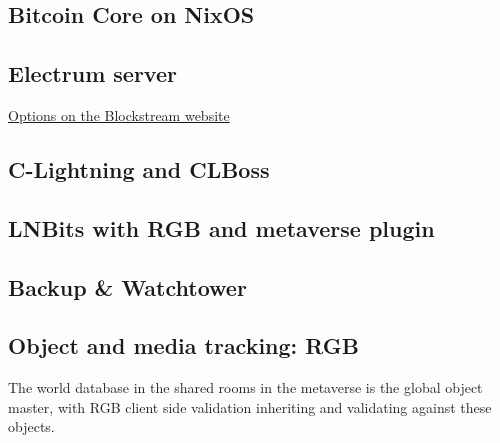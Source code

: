 \subsection{Bitcoin Core on NixOS}
\subsection{Electrum server}
\href{https://blog.blockstream.com/en-esplora-and-other-alternatives-to-electrumx/}{Options on the Blockstream website}
\subsection{C-Lightning and CLBoss}
\subsection{LNBits with RGB and metaverse plugin}
\subsection{Backup \& Watchtower}
\subsection{Object and media tracking: RGB}
The world database in the shared rooms in the metaverse is the global object master, with RGB client side validation inheriting and validating against these objects.\\

